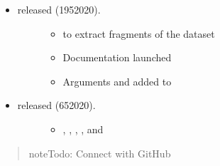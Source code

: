\documentclass[a4paper,12pt,english]{sphinxhowto}
\begin{document}
\begin{itemize}
\item {} \begin{description}
\item[{ released (19\sphinxhyphen{}5\sphinxhyphen{}2020).}] \leavevmode\begin{itemize}
\item {} 
  to extract fragments of the  dataset

\end{itemize}
\begin{itemize}
\item {} 
Documentation  launched

\end{itemize}
\begin{itemize}
\item {} 
Arguments   and  added to 

\end{itemize}

\end{description}

\end{itemize}

\begin{itemize}
\item {} \begin{description}
\item[{ released (6\sphinxhyphen{}5\sphinxhyphen{}2020).}] \leavevmode\begin{itemize}
\item {} 
 , , , , and  

\end{itemize}

\end{description}

\end{itemize}

\begin{quote}

\begin{sphinxadmonition}{note}{\label{\detokenize{sdam:id6}}Todo:}
Connect with GitHub 
\end{sphinxadmonition}
\end{quote}
\end{document}
